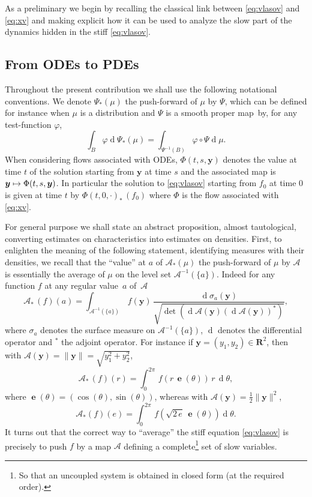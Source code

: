 \documentclass[JEP,XML,SOM,Unicode]{cedram}
\let\mathcal\mathscr
\newcommand\mto{\mathchoice{\longmapsto}{\mapsto}{\mapsto}{\mapsto}}
\DeclareMathOperator\dD{d}\let\dd\dD
\theoremstyle{plain}
\theoremstyle{definition}
\newcommand\R{\mathbf R}
\newcommand\bfy{{\boldsymbol y}}
\newcommand\cA{{\mathcal A}}
\DeclareMathOperator{\beD}{\boldsymbol{e}}
\begin{document}
As a preliminary we begin by recalling the classical link between \eqref{eq:vlasov} and \eqref{eq:xv} and making explicit how it can be used to analyze the slow part of the dynamics hidden in the stiff \eqref{eq:vlasov}.

\subsection{From ODEs to PDEs}\label{s:PDE}

Throughout the present contribution we shall use the following notational
conventions. We denote $\Psi_*(\mu)$ the push-forward of $\mu$ by $\Psi$,
which can be defined for instance when $\mu$ is a distribution and $\Psi$
is a smooth proper map~by, for any test-function $\varphi$,
\[
\int_{B} \varphi \dD \Psi_*(\mu)= \int_{\Psi^{-1}(B)} \varphi\circ \Psi \dD \mu.
\]
When considering flows associated with ODEs, $\Phi(t,s,\bfy)$ denotes the value at time $t$ of the solution starting from $\bfy$ at time $s$ and the associated map is $\bfy\mto \Phi(t,s,\bfy)$. In particular the solution to \eqref{eq:vlasov} starting from $f_0$ at time $0$ is given at time $t$ by $\Phi(t,0,\cdot)_*\,(f_0)$ where $\Phi$ is the flow associated with \eqref{eq:xv}.

For general purpose we shall state an abstract proposition, almost tautological, converting estimates on characteristics into estimates on densities. First, to enlighten the meaning of the following statement, identifying measures with their densities, we recall that the ``value'' at $a$ of $\cA_*(\mu)$ the push-forward of $\mu$ by $\cA$ is essentially the average of $\mu$ on the level set $\cA^{-1}(\{a\})$. Indeed for any function $f$ at any regular value~$a$ of~$\cA$
\[
\cA_*\,(f)(a)=\int_{\cA^{-1}(\{a\})}\,f(\bfy)\,\frac{\dD \sigma_a(\bfy)}{\sqrt{\det(\dD\cA(\bfy)(\dD \cA(\bfy))^*)}},
\]
where $\sigma_a$ denotes the surface measure on $\cA^{-1}(\{a\})$, $\dD$ denotes the differential operator and ${}^*$ the adjoint operator. For instance if $\bfy=(y_1,y_2)\in\R^2$, then with $\cA(\bfy)=\|\bfy\|=\sqrt{y_1^2+y_2^2}$,
\[
\cA_*\,(f)(r)=\int_0^{2\pi}\,f(r\,\beD(\theta))\,r\,\dD \theta,
\]
where $\beD(\theta)=(\cos(\theta),\sin(\theta))$, whereas with $\cA(\bfy)=\tfrac12\|\bfy\|^2$,
\[
\cA_*(f)(e)=\int_0^{2\pi}\,f(\sqrt{2\,e}\,\beD(\theta))\dD \theta.
\]
It turns out that the correct way to ``average'' the stiff equation \eqref{eq:vlasov} is precisely to push $f$ by a map $\cA$ defining a complete\footnote{So that an uncoupled system is obtained in closed form (at the required order).} set of slow variables.
\end{document}
